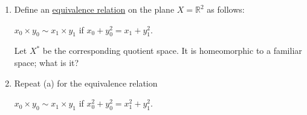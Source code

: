   \begin{exercise}[Munkres 22.4]
    \begin{enumerate}
      \item[(a)] Define an \hyperref[st-def:equivalence_relation]{equivalence relation} on the plane $X = \mathbb{R}^2$ as follows:
      \begin{center}
        $x_0 \times y_0 \sim x_1 \times y_1$ \quad if $x_0 + y_0^2 = x_1 + y_1^2$.
      \end{center}
      Let $X^*$ be the corresponding quotient space. It is homeomorphic to a familiar
      space; what is it? 
      
      \item[(b)] Repeat (a) for the equivalence relation
      \begin{center}
        $x_0 \times y_0 \sim x_1 \times y_1$ \quad if $x_0^2 + y_0^2 = x_1^2 + y_1^2$.
      \end{center}
    \end{enumerate}
  \end{exercise}
